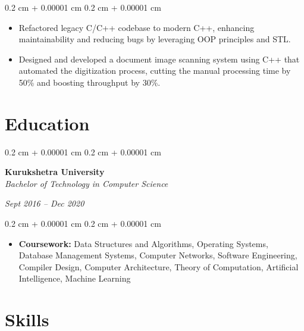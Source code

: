 \documentclass[10pt, letterpaper]{article}
\newenvironment{highlights}{
    \begin{itemize}[
        topsep=0.10 cm,
        parsep=0.10 cm,
        partopsep=0pt,
        itemsep=0pt,
        leftmargin=0.4 cm + 10pt
    ]
}{
    \end{itemize}
} %
\newenvironment{onecolentry}{
    \begin{adjustwidth}{
        0.2 cm + 0.00001 cm
    }{
        0.2 cm + 0.00001 cm
    }
}{
    \end{adjustwidth}
} %
\newenvironment{twocolentry}[2][]{
    \onecolentry
    \def\secondColumn{#2}
    \setcolumnwidth{\fill, 4.5 cm}
    \begin{paracol}{2}
}{
    \switchcolumn \raggedleft \secondColumn
    \end{paracol}
    \endonecolentry
} %
\begin{document}
        \vspace{0.10 cm}
        \begin{onecolentry}
            \begin{highlights}
                \item Refactored legacy C/C++ codebase to modern C++, enhancing maintainability and reducing bugs by leveraging OOP principles and STL.
                \item Designed and developed a document image scanning system using C++ that automated the digitization process, cutting the manual processing time by 50\% and boosting throughput by 30\%.
            \end{highlights}
        \end{onecolentry}

    \section{Education}

        \begin{twocolentry}{
        \textit{Sept 2016 – Dec 2020}}
            \textbf{Kurukshetra University} \\
            \textit{Bachelor of Technology in Computer Science}
        \end{twocolentry}

        \vspace{0.10 cm}
        \begin{onecolentry}
            \begin{highlights}
                \item \textbf{Coursework:} Data Structures and Algorithms, Operating Systems, Database Management Systems, Computer Networks, Software Engineering, Compiler Design, Computer Architecture, Theory of Computation, Artificial Intelligence, Machine Learning
            \end{highlights}
        \end{onecolentry}

    \section{Skills}
\end{document}
